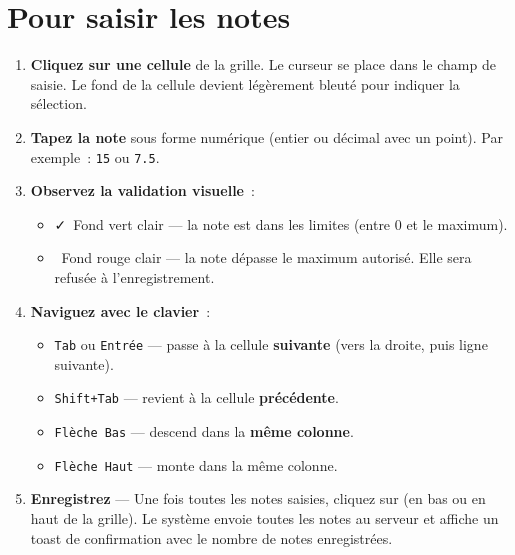 \section{Pour saisir les notes}

\begin{etape}[title=Proc\'edure d\'etaill\'ee : Saisir les notes]
\begin{enumerate}[leftmargin=1.5cm,label=\textbf{\arabic*.},itemsep=12pt]
  \item \textbf{Cliquez sur une cellule} de la grille. Le curseur se place dans le champ de saisie. Le fond de la cellule devient l\'eg\`erement bleut\'e pour indiquer la s\'election.

  \item \textbf{Tapez la note} sous forme num\'erique (entier ou d\'ecimal avec un point). Par exemple~: \texttt{15} ou \texttt{7.5}.

  \item \textbf{Observez la validation visuelle}~:
  \begin{itemize}
    \item \textcolor{emerald}{\faCheck\ Fond vert clair} --- la note est dans les limites (entre 0 et le maximum).
    \item \textcolor{rose}{\faTimes\ Fond rouge clair} --- la note d\'epasse le maximum autoris\'e. Elle sera refus\'ee \`a l'enregistrement.
  \end{itemize}

  \item \textbf{Naviguez avec le clavier}~:
  \begin{itemize}
    \item \texttt{Tab} ou \texttt{Entr\'ee} --- passe \`a la cellule \textbf{suivante} (vers la droite, puis ligne suivante).
    \item \texttt{Shift+Tab} --- revient \`a la cellule \textbf{pr\'ec\'edente}.
    \item \texttt{Fl\`eche Bas} --- descend dans la \textbf{m\^eme colonne}.
    \item \texttt{Fl\`eche Haut} --- monte dans la m\^eme colonne.
  \end{itemize}

  \item \textbf{Enregistrez} --- Une fois toutes les notes saisies, cliquez sur  (en bas ou en haut de la grille). Le syst\`eme envoie toutes les notes au serveur et affiche un toast de confirmation avec le nombre de notes enregistr\'ees.
\end{enumerate}
\end{etape}

